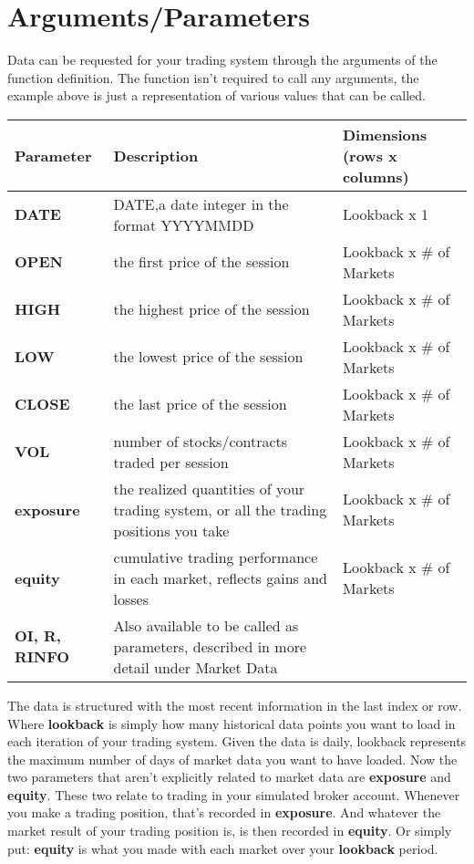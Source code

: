 \documentclass[letterpaper,10pt,english]{sphinxmanual}
\begin{document}
\section{Arguments/Parameters}
\label{ts_structure:arguments-parameters}
Data can be requested for your trading system through the arguments of the function definition. The  function isn’t required to call any arguments, the example above is just a representation of various values that can be called.

\noindent\begin{tabulary}{\linewidth}{|L|L|L|}
\hline
\textsf{\relax 
Parameter
\unskip}\relax &\textsf{\relax 
Description
\unskip}\relax &\textsf{\relax 
Dimensions
(rows x columns)
\unskip}\relax \\
\hline
\textbf{DATE}
&
DATE,a date integer in the
format YYYYMMDD
&
Lookback x 1
\\
\hline
\textbf{OPEN}
&
the first price of the session
&
Lookback x
\# of Markets
\\
\hline
\textbf{HIGH}
&
the highest price of the session
&
Lookback x
\# of Markets
\\
\hline
\textbf{LOW}
&
the lowest price of the session
&
Lookback x
\# of Markets
\\
\hline
\textbf{CLOSE}
&
the last price of the session
&
Lookback x
\# of Markets
\\
\hline
\textbf{VOL}
&
number of stocks/contracts
traded per session
&
Lookback x
\# of Markets
\\
\hline
\textbf{exposure}
&
the realized quantities of your trading system,
or all the trading positions you take
&
Lookback x
\# of Markets
\\
\hline
\textbf{equity}
&
cumulative trading performance in each market,
reflects gains and losses
&
Lookback x
\# of Markets
\\
\hline
\textbf{OI, R,
RINFO}
&
Also available to be called as parameters,
described in more detail under Market Data
&\\
\hline\end{tabulary}


The data is structured with the most recent information in the last index or row. Where \textbf{lookback} is simply how many historical data points you want to load in each iteration of your trading system. Given the data is daily, lookback represents the maximum number of days of market data you want to have loaded. Now the two parameters that aren’t explicitly related to market data are \textbf{exposure} and \textbf{equity}. These two relate to trading in your simulated broker account. Whenever you make a trading position, that’s recorded in \textbf{exposure}. And whatever the market result of your trading position is, is then recorded in \textbf{equity}. Or simply put: \textbf{equity} is what you made with each market over your \textbf{lookback} period.
\end{document}
